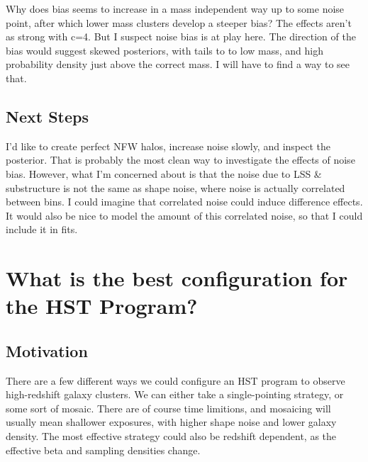 \documentclass[11pt]{article}
\begin{document}
Why does bias seems to increase in a mass independent way up to some noise point, after which lower mass clusters develop a steeper bias? The effects aren't as strong with c=4. But I suspect noise bias is at play here. The direction of the bias would suggest skewed posteriors, with tails to to low mass, and high probability density just above the correct mass. I will have to find a way to see that.


\subsection{Next Steps}

I'd like to create perfect NFW halos, increase noise slowly, and inspect the posterior. That is probably the most clean way to investigate the effects of noise bias. However, what I'm concerned about is that the noise due to LSS \& substructure is not the same as shape noise, where noise is actually correlated between bins. I could imagine that correlated noise could induce difference effects. It would also be nice to model the amount of this correlated noise, so that I could include it in fits. 

\clearpage \newpage

\section{What is the best configuration for the HST Program?}
\label{sec:hstproposal}


\subsection{Motivation}
There are a few different ways we could configure an HST program to observe high-redshift galaxy clusters. We can either take a single-pointing strategy, or some sort of mosaic. There are of course time limitions, and mosaicing will usually mean shallower exposures, with higher shape noise and lower galaxy density. The most effective strategy could also be redshift dependent, as the effective beta and sampling densities change.
\end{document}
